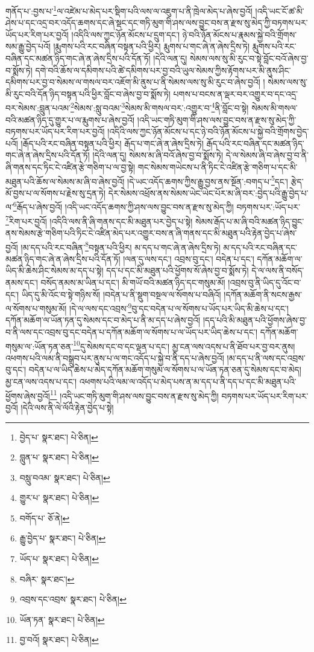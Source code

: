 གནོད་པ་:བྱས་པ་\footnote{བྱེད་པ་  སྣར་ཐང་།  པེ་ཅིན། }ལ་འཛེམ་པ་མེད་པར་སྡིག་པའི་ལས་ལ་འཇུག་པ་ནི་ཁྲེལ་མེད་པ་ཞེས་བྱའོ། །འདི་ཡང་ངོ་ཚ་མི་ཤེས་པ་དང་འདྲ་བར་འདོད་ཆགས་དང་ཞེ་སྡང་དང་གཏི་མུག་གི་ཤས་ལས་བྱུང་བས་ན་རྫས་སུ་མེད་ཀྱི་བཏགས་པར་ཡོད་པར་རིག་པར་བྱའོ། །འདིའི་ལས་ཀྱང་ཉོན་མོངས་པ་དྲུག་དང་། ཉེ་བའི་ཉོན་མོངས་པ་རྣམས་སྐྱེ་བའི་གྲོགས་སམ་རྒྱུ་བྱེད་པའོ། །རྨུགས་པའི་རང་བཞིན་བསྟན་པའི་ཕྱིར། རྨུགས་པ་གང་ཞེ་ན་ཞེས་དྲིས་ཏེ། རྨུགས་པའི་རང་བཞིན་དང་མཚན་ཉིད་གང་ཞེ་ན་ཞེས་དྲིས་པའི་དོན་ཏོ། །དེའི་ལན་དུ། སེམས་ལས་སུ་མི་རུང་བ་སྟེ་བློང་བའོ་ཞེས་བྱ་བ་སྨོས་ཏེ། དགེ་བའི་ཆོས་ལ་དམིགས་པའི་ཚེ་དམིགས་པར་བྱ་བའི་ཡུལ་སེམས་ཀྱིས་རྟོགས་པར་མི་ནུས་ཤིང་དམིགས་པར་བྱ་བ་སེམས་ལ་གསལ་བར་འཇོག་མི་ནུས་པ་ནི་སེམས་ལས་སུ་མི་རུང་བ་ཞེས་བྱའོ། །
སེམས་ལས་སུ་མི་རུང་བའི་དོན་ཉིད་བསྟན་པའི་ཕྱིར་བློང་བ་ཞེས་བྱ་བ་སྨོས་ཏེ། པགས་པ་བངས་ན་ལྡར་བར་འགྱུར་བ་དང་འདྲ་བར་སེམས་:བླུན་པའམ་\footnote{བླུན་པ་  སྣར་ཐང་།  པེ་ཅིན། }སེམས་:སླུ་བའམ་\footnote{བསླུ་བའམ་  སྣར་ཐང་།  པེ་ཅིན། }སེམས་མི་གསལ་བར་:འགྱུར་བ་\footnote{གྱུར་པ་  སྣར་ཐང་།  པེ་ཅིན། }ནི་བློང་བ་སྟེ། སེམས་མི་གསལ་བའི་མཚན་ཉིད་དུ་གྱུར་པ་ལ་རྨུགས་པ་ཞེས་བྱའོ། །འདི་ཡང་གཏི་མུག་གི་ཤས་ལས་བྱུང་བས་ན་རྫས་སུ་མེད་ཀྱི་བཏགས་པར་ཡོད་པར་རིག་པར་བྱའོ། །འདིའི་ལས་ཀྱང་ཉོན་མོངས་པ་དང་ཉེ་བའི་ཉོན་མོངས་པ་སྐྱེ་བའི་གྲོགས་བྱེད་པའོ། །རྒོད་པའི་རང་བཞིན་བསྟན་པའི་ཕྱིར། རྒོད་པ་གང་ཞེ་ན་ཞེས་དྲིས་ཏེ། རྒོད་པའི་རང་བཞིན་དང་མཚན་ཉིད་གང་ཞེ་ན་ཞེས་དྲིས་པའི་དོན་ཏོ། །དེའི་ལན་དུ། སེམས་མ་ཞི་བའོ་ཞེས་བྱ་བ་སྨོས་ཏེ། དེ་ལ་སེམས་ཞི་བ་ཞེས་བྱ་བ་ནི་ཞི་གནས་དང་ཏིང་ངེ་འཛིན་རྩེ་གཅིག་པ་ལ་བྱ་སྟེ། གང་སེམས་གཡེངས་པ་ནི་ཏིང་ངེ་འཛིན་རྩེ་གཅིག་པ་དང་མི་མཐུན་པའི་ཆོས་ལ་སེམས་མ་ཞི་བ་ཞེས་བྱའོ། །དེ་ཡང་འདོད་ཆགས་ཀྱིས་རྒྱུ་བྱས་ནས་སྔོན་:བགད་པ་\footnote{བགོད་པ་  ཅོ་ནེ། }དང་། རྩེད་མོ་བྱས་པ་ལ་སོགས་པ་རྗེས་སུ་དྲན་ཏེ། དེར་སེམས་འཕྲོས་ནས་སེམས་ཡེང་ཡེང་པོར་མ་ཞི་བར་:བྱེད་པའི་རྒྱུ་བྱེད་པ་ལ་\footnote{རྒྱུ་བྱེད་པ་  སྣར་ཐང་།  པེ་ཅིན། }རྒོད་པ་ཞེས་བྱའོ། །འདི་ཡང་འདོད་ཆགས་ཀྱི་ཤས་ལས་བྱུང་བས་ན་རྫས་སུ་མེད་ཀྱི། བཏགས་པར་:ཡོད་པར་\footnote{ཡོད་པ་  སྣར་ཐང་།  པེ་ཅིན། }རིག་པར་བྱའོ། །འདིའི་ལས་ནི་ཞི་གནས་དང་མི་མཐུན་པར་བྱེད་པ་སྟེ། སེམས་རྒོད་པ་མ་ཞི་བའི་མཚན་ཉིད་བྱུང་ནས་སེམས་རྩེ་གཅིག་པའི་ཏིང་ངེ་འཛིན་མེད་པར་འགྱུར་བས་ན་ཞི་གནས་དང་མི་མཐུན་པའི་རྟེན་བྱེད་པ་ཞེས་བྱའོ། །མ་དད་པའི་རང་བཞིན་\footnote{བཞིར་  སྣར་ཐང་། }བསྟན་པའི་ཕྱིར། མ་དད་པ་གང་ཞེ་ན་ཞེས་དྲིས་ཏེ། མ་དད་པའི་རང་བཞིན་དང་མཚན་ཉིད་གང་ཞེ་ན་ཞེས་དྲིས་པའི་དོན་ཏོ། །ལན་དུ་ལས་དང་། འབྲས་བུ་དང་། བདེན་པ་དང་། དཀོན་མཆོག་ལ་ཡིད་མི་ཆེས་ཤིང་སེམས་མ་དད་པ་སྟེ། དད་པ་དང་མི་མཐུན་པའི་ཕྱོགས་སོ་ཞེས་བྱ་བ་སྨོས་ཏེ། དེ་ལ་ལས་ནི་བསོད་ནམས་དང་། བསོད་ནམས་མ་ཡིན་པ་དང་། མི་གཡོ་བའི་མཚན་ཉིད་དང་གསུམ་མོ། །འབྲས་བུ་ནི་ཡིད་དུ་འོང་བ་དང་། ཡིད་དུ་མི་འོང་བ་སྟེ་གཉིས་སོ། །བདེན་པ་ནི་སྡུག་བསྔལ་ལ་སོགས་པ་བཞིའོ། །དཀོན་མཆོག་ནི་སངས་རྒྱས་ལ་སོགས་པ་གསུམ་མོ། །དེ་ལ་ལས་དང་འབྲས་\footnote{འབྲས་དང་འབྲས་  སྣར་ཐང་།  པེ་ཅིན། }བུ་དང་བདེན་པ་ལ་སོགས་པ་ཡོད་པར་ཡིད་མི་ཆེས་པ་དང་། དཀོན་མཆོག་ལ་ཡོན་ཏན་དུ་སེམས་དང་བ་མེད་པ་ནི་མ་དད་པ་ཞེས་བྱའོ། །དད་པའི་མི་མཐུན་པའི་ཕྱོགས་ཞེས་བྱ་བ་ནི་ལས་དང་འབྲས་བུ་དང་བདེན་པ་དཀོན་མཆོག་ལ་སོགས་པ་ལ་ཡོད་པར་ཡིད་ཆེས་པ་དང་། དཀོན་མཆོག་གསུམ་ལ་:ཡོན་ཏན་ཅན་\footnote{ཡོན་ཏན་  སྣར་ཐང་།  པེ་ཅིན། }དུ་སེམས་དང་བ་དང་ལྡན་པ་དང་། མྱ་ངན་ལས་འདས་པ་ནི་ཐོབ་པར་བྱ་བར་ནུས། འཕགས་པའི་ལམ་ནི་བསྒྲུབ་པར་ནུས་པ་ལ་གང་འདོད་པ་སྐྱེ་བ་ནི་དད་པ་ཞེས་བྱའོ། །མ་དད་པ་ནི་ལས་དང་འབྲས་བུ་དང་། བདེན་པ་ལ་ཡིད་ཆེས་པ་མེད་དཀོན་མཆོག་གསུམ་ལ་སོགས་པ་ལ་ཡོན་ཏན་ཅན་དུ་སེམས་དང་བ་མེད། མྱ་ངན་ལས་འདས་པ་དང་། འཕགས་པའི་ལམ་ལ་འདོད་པ་མེད་པས་ན་མ་དད་པ་ནི་དད་པ་དང་མི་མཐུན་པའི་ཕྱོགས་ཞེས་བྱའོ།\footnote{བྱ་བའོ།  སྣར་ཐང་།  པེ་ཅིན། } །འདི་ཡང་གཏི་མུག་གི་ཤས་ལས་བྱུང་བས་ན་རྫས་སུ་མེད་ཀྱི། བཏགས་པར་ཡོད་པར་རིག་པར་བྱའོ། །དེའི་ལས་ནི་ལེ་ལོའི་རྟེན་བྱེད་པ་སྟེ། 